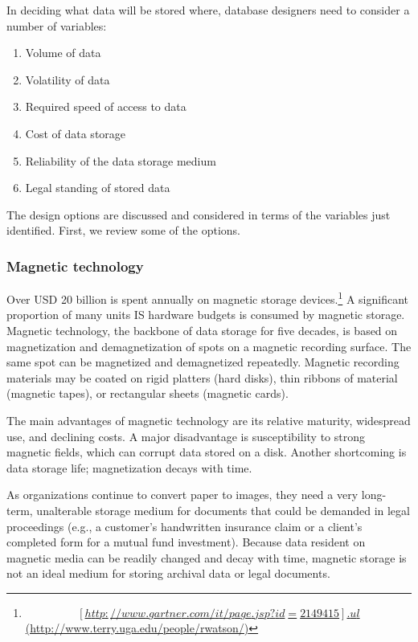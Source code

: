 \documentclass[
]{article}
\begin{document}
In deciding what data will be stored where, database designers need to
consider a number of variables:

\begin{enumerate}
\def\labelenumi{\arabic{enumi}.}
\item
  Volume of data
\item
  Volatility of data
\item
  Required speed of access to data
\item
  Cost of data storage
\item
  Reliability of the data storage medium
\item
  Legal standing of stored data
\end{enumerate}

The design options are discussed and considered in terms of the
variables just identified. First, we review some of the options.

\hypertarget{magnetic-technology}{%
\subsubsection*{Magnetic technology}\label{magnetic-technology}}

Over USD 20 billion is spent annually on magnetic storage devices.\footnote{\href{http://www.gartner.com/it/page.jsp?id=2149415\%5D\%7B.underline\%7D\%5D(http://www.terry.uga.edu/people/rwatson/)}{\[[http://www.gartner.com/it/page.jsp?id=2149415]{.ul}\](http://www.terry.uga.edu/people/rwatson/)}} A
significant proportion of many units IS hardware budgets is consumed by
magnetic storage. Magnetic technology, the backbone of data storage for
five decades, is based on magnetization and demagnetization of spots on
a magnetic recording surface. The same spot can be magnetized and
demagnetized repeatedly. Magnetic recording materials may be coated on
rigid platters (hard disks), thin ribbons of material (magnetic tapes),
or rectangular sheets (magnetic cards).

The main advantages of magnetic technology are its relative maturity,
widespread use, and declining costs. A major disadvantage is
susceptibility to strong magnetic fields, which can corrupt data stored
on a disk. Another shortcoming is data storage life; magnetization
decays with time.

As organizations continue to convert paper to images, they need a very
long-term, unalterable storage medium for documents that could be
demanded in legal proceedings (e.g., a customer's handwritten insurance
claim or a client's completed form for a mutual fund investment).
Because data resident on magnetic media can be readily changed and decay
with time, magnetic storage is not an ideal medium for storing archival
data or legal documents.
\end{document}
